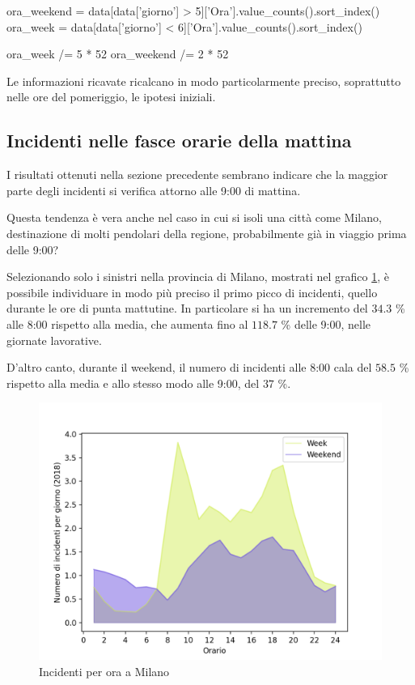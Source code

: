 \documentclass[a4paper,12pt]{report}
\begin{document}
\begin{code}[language=Python]
ora_weekend = data[data['giorno'] > 5]['Ora'].value_counts().sort_index()
ora_week = data[data['giorno'] < 6]['Ora'].value_counts().sort_index()

ora_week /= 5 * 52
ora_weekend /= 2 * 52
\end{code}

Le informazioni ricavate ricalcano in modo particolarmente preciso, 
soprattutto nelle ore del pomeriggio, le ipotesi iniziali. 

\subsection{Incidenti nelle fasce orarie della mattina}

I risultati ottenuti nella sezione precedente sembrano indicare 
che la maggior parte degli incidenti si verifica attorno alle 9:00 di mattina. 

Questa tendenza è vera anche nel caso in cui si isoli una città come Milano, 
destinazione di molti pendolari della regione, probabilmente 
già in viaggio prima delle 9:00?

Selezionando solo i sinistri nella provincia di Milano, mostrati nel grafico 
\ref{fig:week-weekend-milano}, è possibile individuare in modo più preciso
il primo picco di incidenti, quello durante le ore di punta mattutine. 
In particolare si ha un incremento del $34.3$ \% alle 8:00 rispetto alla media, 
che aumenta fino al $118.7$ \% delle 9:00, nelle giornate lavorative. 

D'altro canto, durante il weekend, il numero di incidenti alle 8:00 cala del $58.5$ \% rispetto 
alla media e allo stesso modo alle 9:00, del $37$ \%. 

\begin{figure}
    \includegraphics[width=\linewidth]{../src/incidenti/incidenti_senza_coords/ore_punta/week_weekend_milano.png}
    \caption{Incidenti per ora a Milano}
    \label{fig:week-weekend-milano}
\end{figure}
\end{document}
